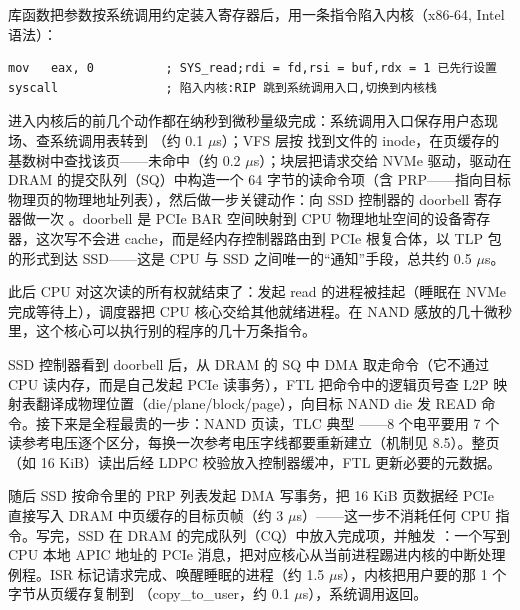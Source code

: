 
 库函数把参数按系统调用约定装入寄存器后，用一条指令陷入内核（x86-64, Intel 语法）：

\begin{lstlisting}
mov   eax, 0          ; SYS_read;rdi = fd,rsi = buf,rdx = 1 已先行设置
syscall               ; 陷入内核:RIP 跳到系统调用入口,切换到内核栈
\end{lstlisting}

进入内核后的前几个动作都在纳秒到微秒量级完成：系统调用入口保存用户态现场、查系统调用表转到 （约 0.1 $\mu$s）；VFS 层按  找到文件的 inode，在页缓存的基数树中查找该页——未命中（约 0.2 $\mu$s）；块层把请求交给 NVMe 驱动，驱动在 DRAM 的提交队列（SQ）中构造一个 64 字节的读命令项（含 PRP——指向目标物理页的物理地址列表），然后做一步关键动作：向 SSD 控制器的 doorbell 寄存器做一次 。doorbell 是 PCIe BAR 空间映射到 CPU 物理地址空间的设备寄存器，这次写不会进 cache，而是经内存控制器路由到 PCIe 根复合体，以 TLP 包的形式到达 SSD——这是 CPU 与 SSD 之间唯一的“通知”手段，总共约 0.5 $\mu$s。

此后 CPU 对这次读的所有权就结束了：发起 read 的进程被挂起（睡眠在 NVMe 完成等待上），调度器把 CPU 核心交给其他就绪进程。在 NAND 感放的几十微秒里，这个核心可以执行别的程序的几十万条指令。


SSD 控制器看到 doorbell 后，从 DRAM 的 SQ 中 DMA 取走命令（它不通过 CPU 读内存，而是自己发起 PCIe 读事务），FTL 把命令中的逻辑页号查 L2P 映射表翻译成物理位置（die/plane/block/page），向目标 NAND die 发 READ 命令。接下来是全程最贵的一步：NAND 页读，TLC 典型 ——8 个电平要用 7 个读参考电压逐个区分，每换一次参考电压字线都要重新建立（机制见 8.5）。整页（如 16 KiB）读出后经 LDPC 校验放入控制器缓冲，FTL 更新必要的元数据。

随后 SSD 按命令里的 PRP 列表发起 DMA 写事务，把 16 KiB 页数据经 PCIe 直接写入 DRAM 中页缓存的目标页帧（约 3 $\mu$s）——这一步不消耗任何 CPU 指令。写完，SSD 在 DRAM 的完成队列（CQ）中放入完成项，并触发 ：一个写到 CPU 本地 APIC 地址的 PCIe 消息，把对应核心从当前进程踢进内核的中断处理例程。ISR 标记请求完成、唤醒睡眠的进程（约 1.5 $\mu$s），内核把用户要的那 1 个字节从页缓存复制到 （copy\_to\_user，约 0.1 $\mu$s），系统调用返回。


